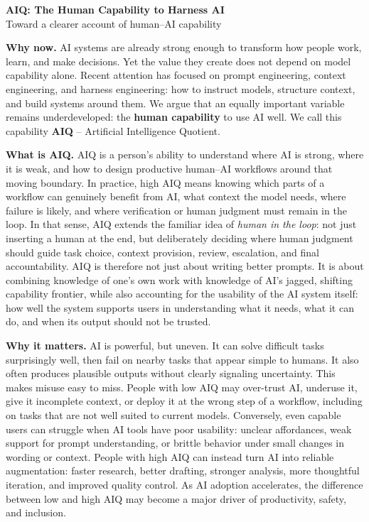 \documentclass[10pt]{article}
\begin{document}
\begin{center}
{\LARGE \textbf{AIQ: The Human Capability to Harness AI}}\\[0.35em]
{\large Toward a clearer account of human--AI capability}
\end{center}

\textbf{Why now.}
AI systems are already strong enough to transform how people work, learn, and make decisions. Yet the value they create does not depend on model capability alone. Recent attention has focused on prompt engineering, context engineering, and harness engineering: how to instruct models, structure context, and build systems around them. We argue that an equally important variable remains underdeveloped: the \textbf{human capability} to use AI well. We call this capability \textbf{AIQ} -- Artificial Intelligence Quotient.

\textbf{What is AIQ.}
AIQ is a person's ability to understand where AI is strong, where it is weak, and how to design productive human--AI workflows around that moving boundary. In practice, high AIQ means knowing which parts of a workflow can genuinely benefit from AI, what context the model needs, where failure is likely, and where verification or human judgment must remain in the loop. In that sense, AIQ extends the familiar idea of \emph{human in the loop}: not just inserting a human at the end, but deliberately deciding where human judgment should guide task choice, context provision, review, escalation, and final accountability. AIQ is therefore not just about writing better prompts. It is about combining knowledge of one's own work with knowledge of AI's jagged, shifting capability frontier, while also accounting for the usability of the AI system itself: how well the system supports users in understanding what it needs, what it can do, and when its output should not be trusted.

\textbf{Why it matters.}
AI is powerful, but uneven. It can solve difficult tasks surprisingly well, then fail on nearby tasks that appear simple to humans. It also often produces plausible outputs without clearly signaling uncertainty. This makes misuse easy to miss. People with low AIQ may over-trust AI, underuse it, give it incomplete context, or deploy it at the wrong step of a workflow, including on tasks that are not well suited to current models. Conversely, even capable users can struggle when AI tools have poor usability: unclear affordances, weak support for prompt understanding, or brittle behavior under small changes in wording or context. People with high AIQ can instead turn AI into reliable augmentation: faster research, better drafting, stronger analysis, more thoughtful iteration, and improved quality control. As AI adoption accelerates, the difference between low and high AIQ may become a major driver of productivity, safety, and inclusion.
\end{document}
